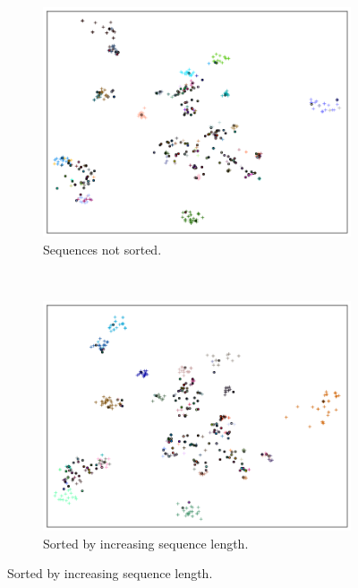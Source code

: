 \begin{figure}[H]
  \centering
  \begin{subfigure}[t]{1.0\textwidth}
    \includegraphics[width=1.0\textwidth]{graphics/SILVA_t-SNE_500.png}
    \caption{Sequences not sorted.}
    \label{fig:mds_silva_no_sort}
  \end{subfigure}

  \hfill\\
  \hspace{2em}
  \begin{subfigure}[b]{1.0\textwidth}
    \includegraphics[width=1.0\textwidth]{graphics/SILVA_t-SNE_incr_sort_500.png}
    \caption{Sorted by increasing sequence length.}
    \label{fig:mds_silva_sort_incr}
  \end{subfigure}
\end{figure}
